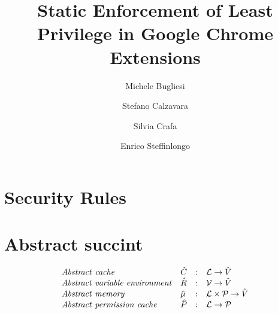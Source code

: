 \documentclass[[12pt,a4paper,twoside,openrigh]{article}
\author{Michele Bugliesi \and Stefano Calzavara \and Silvia Crafa \and Enrico Steffinlongo}
\title{Static Enforcement of Least Privilege in Google Chrome Extensions}
\newcommand{\Cat}[0]{\hat{C}}
\newcommand{\Rat}[0]{\hat{R}}
\newcommand{\Pat}[0]{\hat{P}}
\begin{document}
\maketitle
\tableofcontents

\section{Security Rules}
\section{Abstract succint}
\[
\begin{array}{llcl}
\mathit{Abstract\ cache} & \Cat & : & \labs \rightarrow \absvalues \\
\mathit{Abstract\ variable\ environment} & \Rat & : & \vars \rightarrow \absvalues \\
\mathit{Abstract\ memory} & \absmem & : & \labs \times \perms \rightarrow \absvalues \\
\mathit{Abstract\ permission\ cache} & \Pat & : & \labs \rightarrow \perms \\
\end{array}
\]
\end{document}

